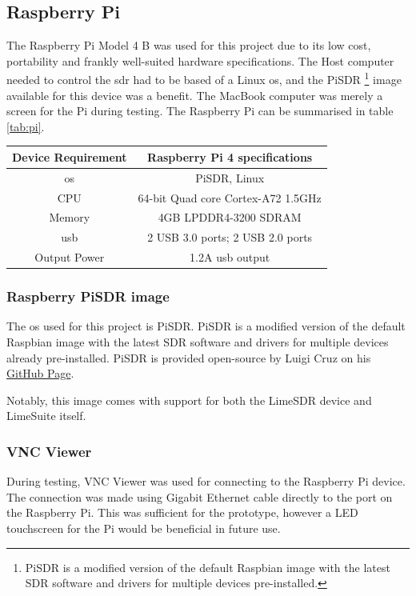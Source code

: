 \documentclass[class=report,11pt,crop=false]{standalone}
\begin{document}
\subsection{Raspberry Pi}
The Raspberry Pi Model 4 B was used for this project due to its low cost, portability and frankly well-suited hardware specifications. The Host computer needed to control the \gls{sdr} had to be based of a Linux \gls{os}, and the PiSDR \footnote{PiSDR is a modified version of the default Raspbian image with the latest SDR software and drivers for multiple devices pre-installed.} image available for this device was a benefit. The MacBook computer was merely a screen for the Pi during testing.  The Raspberry Pi can be summarised in table \ref{tab:pi}.

\vspace{0.5cm}
\begin{center}
    \begin{tabular}{c|c}
        Device Requirement & Raspberry Pi 4 specifications  \\
        \hline
        \gls{os} & PiSDR, Linux \\
        CPU & 64-bit Quad core Cortex-A72 \@ 1.5GHz \\
        Memory & 4GB LPDDR4-3200 SDRAM\\
        \gls{usb} & 2 USB 3.0 ports; 2 USB 2.0 ports\\ 
        Output Power & 1.2A \gls{usb} output\\
    \end{tabular}
\end{center}

\subsubsection{Raspberry PiSDR image}
The \gls{os} used for this project is PiSDR. PiSDR is a modified version of the default Raspbian image with the latest SDR software and drivers for multiple devices already pre-installed. PiSDR is provided open-source by Luigi Cruz on his \href{https://github.com/luigifcruz}{GitHub Page}.

Notably, this image comes with support for both the LimeSDR device and LimeSuite itself. 

\subsubsection{VNC Viewer}
During testing, VNC Viewer was used for connecting to the Raspberry Pi device. The connection was made using Gigabit Ethernet cable directly to the port on the Raspberry Pi. This was sufficient for the prototype, however a LED touchscreen for the Pi would be beneficial in future use. 
\end{document}
